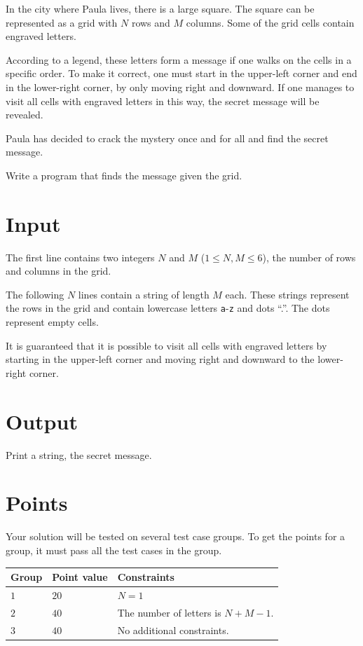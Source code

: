 \noindent
In the city where Paula lives, there is a large square. 
The square can be represented as a grid with $N$ rows and $M$ columns. 
Some of the grid cells contain engraved letters.

According to a legend, these letters form a message if one walks on the cells 
in a specific order. To make it correct, one must start in the upper-left 
corner and end in the lower-right corner, by only moving right and downward. 
If one manages to visit all cells with engraved letters in this way, 
the secret message will be revealed.

Paula has decided to crack the mystery once and for all and find the secret message.

Write a program that finds the message given the grid.

\section*{Input}
The first line contains two integers $N$ and $M$ ($1 \leq N, M \leq 6$), 
the number of rows and columns in the grid.

The following $N$ lines contain a string of length $M$ each. 
These strings represent the rows in the grid and contain lowercase 
letters \texttt{a}-\texttt{z} and dots ``.''. The dots represent empty cells.

It is guaranteed that it is possible to visit all cells with engraved letters 
by starting in the upper-left corner and moving right and downward to the lower-right corner.

\section*{Output}
Print a string, the secret message.

\section*{Points}
Your solution will be tested on several test case groups.
To get the points for a group, it must pass all the test cases in the group.

\noindent
\begin{tabular}{| l | l | p{12cm} |}
  \hline
  \textbf{Group} & \textbf{Point value} & \textbf{Constraints} \\ \hline
  $1$    & $20$       & $N = 1$ \\ \hline
  $2$    & $40$       & The number of letters is $N+M-1$. \\ \hline
  $3$    & $40$       & No additional constraints. \\ \hline
\end{tabular}

